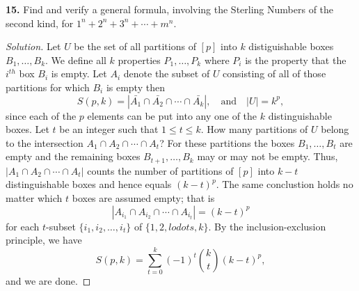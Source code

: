 \documentclass[12pt]{amsart}
\newenvironment{solution}
{\begin{proof}[Solution]}
{\end{proof}}
\begin{document}
\begin{onehalfspace}
        \noindent\textbf{15.} Find and verify a general formula, involving the Sterling Numbers of the second kind,
        for $1^n + 2^n + 3^n + \cdots + m^n$.
        \begin{solution}
            Let $U$ be the set of all partitions of $[p]$ into $k$ distiguishable boxes $B_1,\ldots,B_{k}$.
            We define all $k$ properties $P_1,\ldots,P_k$ where $P_i$ is the property that the $i^{th}$ box $B_i$ is
            empty.
            Let $A_i$ denote the subset of $U$ consisting of all of those partitions for which $B_i$ is empty
            then
            \begin{displaymath}
                S(p,k) = |\bar{A_1}\cap\bar{A_2}\cap\cdots\cap\bar{A_k}|,\quad\text{and}\quad |U|=k^p,
            \end{displaymath}
            since each of the $p$ elements can be put into any one of the $k$ distinguishable boxes.
            Let $t$ be an integer such that $1\le t\le k$.
            How many partitions of $U$ belong to the intersection $A_1\cap A_2\cap\cdots\cap A_t$?
            For these partitions the boxes $B_1,\ldots,B_t$ are empty and the remaining boxes
            $B_{t+1},\ldots,B_k$ may or may not be empty.
            Thus, $|A_1\cap A_2\cap\cdots\cap A_t|$ counts the number of partitions of $[p]$ into $k-t$
            distinguishable boxes and hence equals $(k-t)^p$.
            The same conclustion holds no matter which $t$ boxes are assumed empty; that is
            \begin{displaymath}
                |A_{i_1}\cap A_{i_2}\cap\cdots\cap A_{i_t}| = (k-t)^p
            \end{displaymath}
            for each $t$-subset $\{i_1,i_2,\ldots,i_t\}$ of $\{1, 2, lodots, k\}$.
            By the inclusion-exclusion principle, we have
            \begin{displaymath}
                S(p,k) = \sum_{t=0}^k(-1)^t\binom{k}{t}(k-t)^p,
            \end{displaymath}
            and we are done.
        \end{solution}

    \end{onehalfspace}
\end{document}
